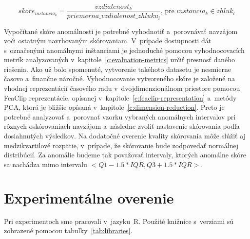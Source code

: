 \documentclass[a4paper,twoside,slovak,12pt,appendix]{article}
\begin{document}
\begin{equation}
  skore_{instancia_k} = \frac{vzdialenost_k}{priemerna\_vzdialenost\_zhluku_l} \text{, pre } instancia_k \in zhluk_l
  \label{eq:instance-score}
\end{equation}

Vypočítané skóre anomálnosti je potrebné vyhodnotiť a~porovnávať navzájom voči
ostatným navrhovaným skórovaniam. V~prípade dostupnosti dát s~označenými
anomálnymi inštanciami je jednoduché pomocou vyhodnocovacích metrík
analyzovaných v~kapitole~\ref{c:evaluation-metrics} určiť presnosť daného
riešenia. Ako už bolo spomenuté, vytvorenie takéhoto datasetu je nesmierne
časovo a~finančne náročné. Vyhodnocovanie vytvoreného skóre je založené na
vhodnej reprezentácií časového radu v~dvojdimenzionálnom priestore pomocou
FeaClip reprezentácie, opísanej v~kapitole~\ref{c:feaclip-representation}
a~metódy PCA, ktorá je bližšie opísaná v~kapitole~\ref{c:dimension-reduction}.
Preto je potrebné analyzovať a~porovnať vzorku vybraných anomálnych intervalov
pri rôznych oskórovaniach navzájom a~následne zvoliť nastavenie skórovania podľa
dosiahnutých výsledkov. Na dodatočné overenie kvality skórovania môže slúžiť aj
medzikvartilové rozpätie, v~prípade, že skórovanie bude zodpovedať normálnej
distribúcií. Za anomálie budeme tak považovať intervaly, ktorých anomálne skóre
sa nachádza mimo intervalu $<Q1 - 1.5 * IQR, Q3 + 1.5 * IQR>$.


\newpage
\section{Experimentálne overenie}
Pri experimentoch sme pracovali v~jazyku~R. Použité knižnice s~verziami sú
zobrazené pomocou tabuľky~\ref{tab:libraries}.
\end{document}
